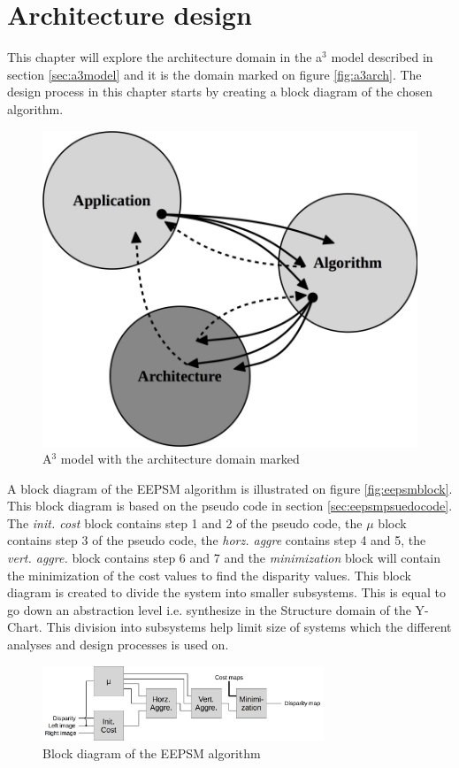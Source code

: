 \chapter{Architecture design} \label{ch:archdesign}

This chapter will explore the architecture domain in the a$^3$ model described in section \vref{sec:a3model} and it is the domain marked on figure \vref{fig:a3arch}. The design process in this chapter starts by creating a block diagram of the chosen algorithm.\\
\begin{figure}[ht!]
  \centering
  \includegraphics[scale=0.25]{figures/a3arch}
  \caption{A$^3$ model with the architecture domain marked}
  \label{fig:a3arch}
\end{figure}

A block diagram of the EEPSM algorithm is illustrated on figure \vref{fig:eepsmblock}. This block diagram is based on the pseudo code in section \vref{sec:eepsmpsuedocode}. The \textit{init. cost} block contains step 1 and 2 of the pseudo code, the $\mu$ block contains step 3 of the pseudo code, the \textit{horz. aggre} contains step 4 and 5, the \textit{vert. aggre.} block contains step 6 and 7 and the \textit{minimization} block will contain the minimization of the cost values to find the disparity values. This block diagram is created to divide the system into smaller subsystems. This is equal to go down an abstraction level i.e. synthesize in the Structure domain of the Y-Chart. This division into subsystems help limit size of systems which the different analyses and design processes is used on.\\
\begin{figure}[ht!]
  \centering
  \includegraphics[width=0.75\textwidth]{figures/eepsmblockmain}
  \caption{Block diagram of the EEPSM algorithm}
  \label{fig:eepsmblock}
\end{figure}


